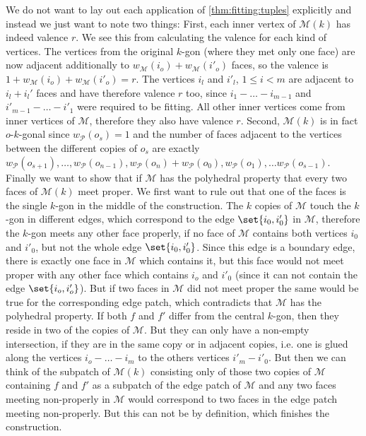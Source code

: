 \begin{construction}
\begin{cdescription}
    We do not want to lay out each application of \autoref{thm:fitting:tuples} explicitly and instead we just want to note two things: First, each inner vertex of $\mathcal{M}(k)$ has indeed valence $r$. We see this from calculating the valence for each kind of vertices. The vertices from the original $k$-gon (where they met only one face) are now adjacent additionally to $w_{\mathcal{M}}(i_o) + w_{\mathcal{M}}(i'_o)$ faces, so the valence is $1 + w_{\mathcal{M}}(i_o) + w_{\mathcal{M}}(i'_o) = r$. The vertices $i_l$ and $i'_l$, $1 \leq i < m$ are adjacent to $i_l + i_l'$ faces and have therefore valence $r$ too, since $i_1 - \dots - i_{m-1}$ and $i'_{m-1} - \dots - i'_1$ were required to be fitting. All other inner vertices come from inner vertices of $\mathcal{M}$, therefore they also have valence $r$. Second, $\mathcal{M}(k)$ is in fact $o$-$k$-gonal since $w_{\mathcal{P}}(o_s) = 1$ and the number of faces adjacent to the vertices between the different copies of $o_s$ are exactly $w_{\mathcal{P}}(o_{s + 1}), \dots, w_{\mathcal{P}}(o_{n - 1}), w_{\mathcal{P}}(o_n) + w_{\mathcal{P}}(o_0), w_{\mathcal{P}}(o_1), \dots w_{\mathcal{P}}(o_{s - 1})$. Finally we want to show that if $\mathcal{M}$ has the polyhedral property that every two faces of $\mathcal{M}(k)$ meet proper. We first want to rule out that one of the faces is the single $k$-gon in the middle of the construction. The $k$ copies of $\mathcal{M}$ touch the $k$-gon in different edges, which correspond to the edge $\set{i_0, i'_0}$ in $\mathcal{M}$, therefore the $k$-gon meets any other face properly, if no face of $\mathcal{M}$ contains both vertices $i_0$ and $i'_0$, but not the whole edge $\set{i_0, i'_0}$. Since this edge is a boundary edge, there is exactly one face in $\mathcal{M}$ which contains it, but this face would not meet proper with any other face which contains $i_o$ and $i'_0$ (since it can not contain the edge $\set{i_o, i'_o}$). But if two faces in $\mathcal{M}$ did not meet proper the same would be true for the corresponding edge patch, which contradicts that $\mathcal{M}$ has the polyhedral property. If both $f$ and $f'$ differ from the central $k$-gon, then they reside in two of the copies of $\mathcal{M}$. But they can only have a non-empty intersection, if they are in the same copy or in adjacent copies, i.e. one is glued along the vertices $i_o - \dots - i_m$ to the others vertices $i'_m - i'_0$. But then we can think of the subpatch of $\mathcal{M}(k)$ consisting only of those two copies of $\mathcal{M}$ containing $f$ and $f'$ as a subpatch of the edge patch of $\mathcal{M}$ and any two faces meeting non-properly in $\mathcal{M}$ would correspond to two faces in the edge patch meeting non-properly. But this can not be by definition, which finishes the construction. 
  \end{cdescription}
\end{construction}

